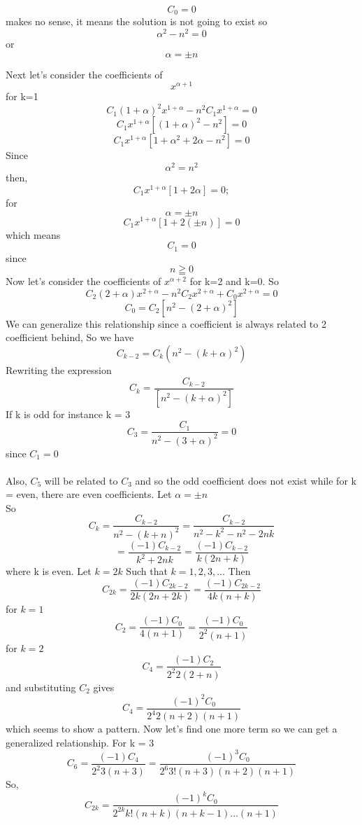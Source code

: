 	$$C_0 =0$$ makes no sense, it means the solution is not going to exist so  $$\alpha^2 -n^2 =0$$ or  $$\alpha =\pm n$$
	
	Next let's consider the coefficients of $$x^{\alpha + 1}$$ for k=1
	$$C_1(1 + \alpha)^2 x^{1 + \alpha} - n^2 C_1 x^{1 + \alpha} = 0$$
	$$C_1x^{1 + \alpha}[(1 + \alpha)^2 - n^2] =0$$
	$$C_1x^{1 + \alpha}[1 + \alpha^2 + 2\alpha - n^2] =0$$
	Since $$\alpha^2 = n^2$$ then,
	$$C_1x^{1 + \alpha}[1 + 2\alpha] =0;$$ for   $$\alpha =\pm n$$
	$$C_1x^{1 + \alpha}[1 + 2(\pm n)] = 0$$ which means $$C_1 = 0$$ since $$n \geqq 0$$
	Now let's consider the coefficients of $x^{\alpha + 2}$ for k=2 and k=0.
	So $$C_2(2 + \alpha) x^{2 + \alpha} - n^2 C_2x^{2 + \alpha} + C_0x^{2 + \alpha} = 0$$
	$$C_0 = C_2[n^2 - (2 + \alpha)^2]$$
	We can generalize this relationship since a coefficient is always related to 2 coefficient behind, So we have 
	$$C_{k-2} = C_k (n^2 - (k + \alpha)^2)$$
	Rewriting the expression
	$$C_k = \frac{C_{k-2}}{[n^2 - (k + \alpha)^2]}$$
	If k is odd for instance k = 3
	$$C_3 = \frac{C_{1}}{n^2 - (3 + \alpha)^2} = 0$$ since $C_1 = 0$ 
	\\\\
	Also, $C_5$ will be related to $C_3$ and so the odd coefficient does not exist while for k = even, there are even coefficients.
	Let $\alpha = \pm n$
	\\
	So 
	$$C_k = \frac{C_{k-2}}{n^2 - (k + n)^2} = \frac{C_{k-2}}{n^2 - k^2 - n^2 - 2nk}$$
	$$ =\frac{(-1) C_{k-2}}{k^2 + 2nk} = \frac{(-1) C_{k-2}}{k(2n + k)}$$ where k is even. 
	Let $k =2k$ Such that $k = 1, 2, 3, ...$
	Then $$C_{2k} = \frac{(-1) C_{2k-2}}{2k(2n + 2k)} = \frac{(-1) C_{2k-2}}{4k(n + k)}$$
	for $k=1$
	$$C_2 = \frac{(-1) C_0}{4(n + 1)} = \frac{(-1) C_0}{2^2(n + 1)}$$
	for $k = 2$
	$$C_4 = \frac{(-1) C_2}{2^2 2(2 + n)}$$ and substituting $C_2$ gives 
	$$C_4 = \frac{(-1)^2 C_0}{2^4 2(n + 2)(n + 1)}$$
	which seems to show a pattern. Now let's find one more term so we can get a generalized relationship.
	For k = 3
	$$C_6 = \frac{(-1) C_4}{2^2 3(n + 3)} = \frac{(-1)^3 C_0}{2^6 3!(n + 3)(n + 2)(n + 1)}$$	
	So, $$ C_{2k} = \frac{(-1)^k C_0}{2^{2k} k!(n + k)(n + k-1)... (n + 1)}$$	
	
